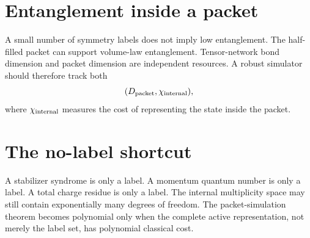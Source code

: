 \section{Entanglement inside a packet}
A small number of symmetry labels does not imply low entanglement. The half-filled packet can support volume-law entanglement. Tensor-network bond dimension and packet dimension are independent resources. A robust simulator should therefore track both
\[
(D_{\rm packet},\chi_{\rm internal}),
\]
where $\chi_{\rm internal}$ measures the cost of representing the state inside the packet.

\section{The no-label shortcut}
A stabilizer syndrome is only a label. A momentum quantum number is only a label. A total charge residue is only a label. The internal multiplicity space may still contain exponentially many degrees of freedom. The packet-simulation theorem becomes polynomial only when the complete active representation, not merely the label set, has polynomial classical cost.
